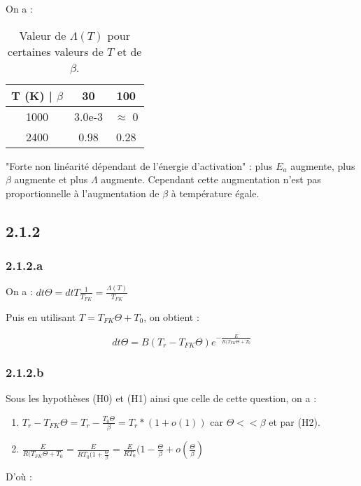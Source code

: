 \documentclass[10pt,a4paper,twocolumn]{article}
\begin{document}
On a : 

\begin{table}[H]
	\begin{center}
	\begin{tabular}{|c|c|c|}
 		\hline
 		T (K) | $\beta$ & 30 & 100 \\ 
 		\hline
 		1000 & 3.0e-3 & $\approx$ 0 \\ 
 		\hline
 		2400 & 0.98 & 0.28  \\
 		\hline
	\end{tabular}
	\end{center}
 \caption{Valeur de $\Lambda(T)$ pour certaines valeurs de $T$ et de $\beta$.}
\end{table}


"Forte non linéarité dépendant de l'énergie d'activation" : plus $E_a$ augmente, plus $\beta$ augmente et plus $\Lambda$ augmente.
Cependant cette augmentation n'est pas proportionnelle à  l'augmentation de $\beta$ à température égale.

\subsection{2.1.2}
\subsubsection{2.1.2.a}

On a : $ dt\Theta = dtT \frac{1}{T_{FK}}  = \frac{\Lambda(T)}{T_{FK}}$

Puis en utilisant $ T = T_{FK} \Theta + T_0 $, on obtient :

	$$ dt\Theta = B(T_r - T_{FK} \Theta)e^{-\frac{E}{R(T_{FK}\Theta+T_0}} $$
	
\subsubsection{2.1.2.b}

Sous les hypothèses (H0) et (H1) ainsi que celle de cette question, on a :
\begin{enumerate}
	\item $T_r - T_{FK} \Theta = T_r - \frac{T_0\Theta}{\beta} = T_r*(1 + o(1))$ car $\Theta << \beta$ et par (H2).
	\item $\frac{E}{R(T_{FK}\Theta+T_0} = \frac{E}{RT_0(1+\frac{\Theta}{\beta}} = \frac{E}{RT_0} (1-\frac{\Theta}{\beta} + o(\frac{\Theta}{\beta}) $ 
\end{enumerate} 

D'où : 
\end{document}
